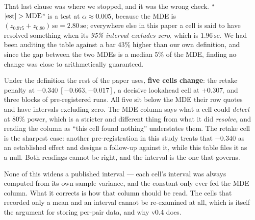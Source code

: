 \documentclass[11pt,a4paper]{article}
\begin{document}
That last clause was where we stopped, and it was the wrong check. ``$|{\rm
est}| > {\rm MDE}$'' is a test at $\alpha \approx 0.005$, because the MDE is
$(z_{0.975} + z_{0.80})\,\mathrm{se} = 2.80\,\mathrm{se}$; everywhere else in
this paper a cell is said to have resolved something when its \emph{95\%
interval excludes zero}, which is $1.96\,\mathrm{se}$. We had been auditing the
table against a bar $43\%$ higher than our own definition, and since the gap
between the two MDEs is a median $5\%$ of the MDE, finding no change was close
to arithmetically guaranteed.

Under the definition the rest of the paper uses, \textbf{five cells change}: the
retake penalty at $-0.340\ [-0.663, -0.017]$, a decisive lookahead cell at
$+0.307$, and three blocks of pre-registered runs. All five sit below the MDE
their row quotes and have intervals excluding zero. The MDE column says what a
cell could \emph{detect} at $80\%$ power, which is a stricter and different thing
from what it did \emph{resolve}, and reading the column as ``this cell found
nothing'' understates them. The retake cell is the sharpest case: another
pre-registration in this study treats that $-0.340$ as an established effect and
designs a follow-up against it, while this table files it as a null. Both
readings cannot be right, and the interval is the one that governs.

None of this widens a published interval --- each cell's interval was always
computed from its own sample variance, and the constant only ever fed the MDE
column. What it corrects is how that column should be read. The cells that
recorded only a mean and an interval cannot be re-examined at all, which is
itself the argument for storing per-pair data, and why v0.4 does.
\end{document}
